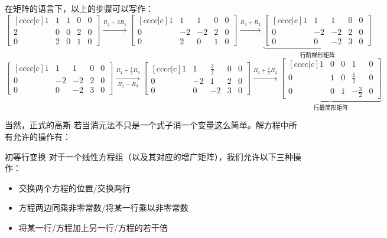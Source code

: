 \documentclass{ctexart}
\begin{document}
在矩阵的语言下，以上的步骤可以写作：
\[
    \begin{bmatrix}[cccc|c]
        1 & 1 & 1 & 0 & 0\\
        2 & 0 & 0 & 2 & 0\\
        0 & 2 & 0 & 1 & 0
    \end{bmatrix}
    \xrightarrow{R_{2} - 2R_{1}}
    \begin{bmatrix}[cccc|c]
        1 & 1 & 1 & 0 & 0\\
        0 & -2 & -2 & 2 & 0\\
        0 & 2 & 0 & 1 & 0
    \end{bmatrix}
    \xrightarrow{R_{3} + R_{2}}
    \underbrace{
        \begin{bmatrix}[cccc|c]
            1 & 1 & 1 & 0 & 0\\
            0 & -2 & -2 & 2 & 0\\
            0 & 0 & -2 & 3 & 0
    \end{bmatrix}}_{\text{行阶梯形矩阵}}
\]
\[
    \begin{bmatrix}[cccc|c]
        1 & 1 & 1 & 0 & 0\\
        0 & -2 & -2 & 2 & 0\\
        0 & 0 & -2 & 3 & 0
    \end{bmatrix}
    \xrightarrow[R_{2} - R_{3}]{R_{1} + \frac{1}{2}R_{3}}
    \begin{bmatrix}[cccc|c]
        1 & 1 & \frac{3}{2} & 0 & 0\\
        0 & -2 & 1 & 2 & 0\\
        0 & 0 & -2 & 3 & 0
    \end{bmatrix}
    \xrightarrow{R_{1} + \frac{1}{2}R_{2}}
    \underbrace{
        \begin{bmatrix}[cccc|c]
            1 & 0 & 0 & 1 & 0\\
            0 & 1 & 0 & \frac{1}{2} & 0\\
            0 & 0 & 1 & -\frac{3}{2} & 0
    \end{bmatrix}}_{\text{行最简形矩阵}}
\]

当然，正式的高斯-若当消元法不只是一个式子消一个变量这么简单。解方程中所有允许的操作有：
\begin{definition}{初等行变换}
    对于一个线性方程组（以及其对应的增广矩阵），我们允许以下三种操作：
    \begin{itemize}
        \item 交换两个方程的位置/交换两行
        \item 方程两边同乘非零常数/将某一行乘以非零常数
        \item 将某一行/方程加上另一行/方程的若干倍
    \end{itemize}
\end{definition}
\end{document}
